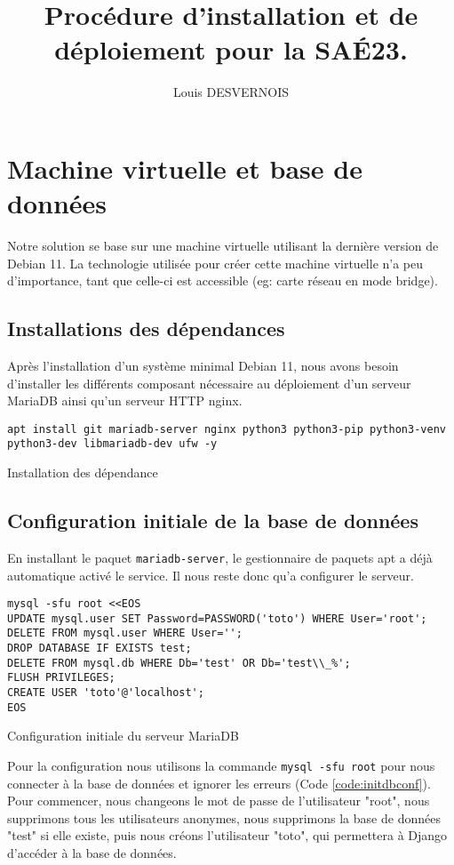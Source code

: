 \documentclass{article}
\author{Louis DESVERNOIS}
\title{Procédure d'installation et de déploiement pour la SAÉ23.}
\begin{document}
\maketitle
\tableofcontents
\listoffigures
\listoflistings
\newpage
\section{Machine virtuelle et base de données}
    Notre solution se base sur une machine virtuelle utilisant la dernière version de Debian 11. La technologie utilisée pour créer cette machine virtuelle n'a peu d'importance, tant que celle-ci est accessible (eg: carte réseau en mode bridge). 

        \subsection{Installations des dépendances}
        Après l'installation d'un système minimal Debian 11, nous avons besoin d'installer les différents composant nécessaire au déploiement d'un serveur MariaDB ainsi qu'un serveur HTTP nginx.
        \begin{listing}[H]
            \begin{verbatim}
apt install git mariadb-server nginx python3 python3-pip python3-venv python3-dev libmariadb-dev ufw -y               
            \end{verbatim}
            \caption{Installation des dépendance}
            \label{code:deps-install}
        \end{listing}

        \subsection{Configuration initiale de la base de données}
        En installant le paquet \verb|mariadb-server|, le gestionnaire de paquets apt a déjà automatique activé le service. Il nous reste donc qu'a configurer le serveur.
        \begin{listing}[H]
            \begin{verbatim}
mysql -sfu root <<EOS
UPDATE mysql.user SET Password=PASSWORD('toto') WHERE User='root';
DELETE FROM mysql.user WHERE User='';
DROP DATABASE IF EXISTS test;
DELETE FROM mysql.db WHERE Db='test' OR Db='test\\_%';
FLUSH PRIVILEGES;
CREATE USER 'toto'@'localhost';
EOS
            \end{verbatim}
            \caption{Configuration initiale du serveur MariaDB}
            \label{code:initdbconf}
        \end{listing}
        Pour la configuration nous utilisons la commande \verb|mysql -sfu root| pour nous connecter à la base de données et ignorer les erreurs (Code \ref{code:initdbconf}). Pour commencer, nous changeons le mot de passe de l'utilisateur "root", nous supprimons tous les utilisateurs anonymes, nous supprimons la base de données "test" si elle existe, puis nous créons l'utilisateur "toto", qui permettera à Django d'accéder à la base de données.
\end{document}

